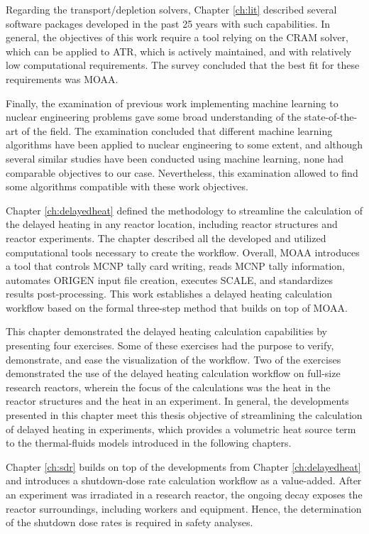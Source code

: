 Regarding the transport/depletion solvers, Chapter \ref{ch:lit} described several software packages developed in the past 25 years with such capabilities.
In general, the objectives of this work require a tool relying on the CRAM solver, which can be applied to ATR, which is actively maintained, and with relatively low computational requirements.
The survey concluded that the best fit for these requirements was MOAA.

Finally, the examination of previous work implementing machine learning to nuclear engineering problems gave some broad understanding of the state-of-the-art of the field.
The examination concluded that different machine learning algorithms have been applied to nuclear engineering to some extent, and although several similar studies have been conducted using machine learning, none had comparable objectives to our case.
Nevertheless, this examination allowed to find some algorithms compatible with these work objectives.


Chapter \ref{ch:delayedheat} defined the methodology to streamline the calculation of the delayed heating in any reactor location, including reactor structures and reactor experiments.
The chapter described all the developed and utilized computational tools necessary to create the workflow.
Overall, MOAA introduces a tool that controls MCNP tally card writing, reads MCNP tally information, automates ORIGEN input file creation, executes SCALE, and standardizes results post-processing.
This work establishes a delayed heating calculation workflow based on the formal three-step method that builds on top of MOAA.

This chapter demonstrated the delayed heating calculation capabilities by presenting four exercises.
Some of these exercises had the purpose to verify, demonstrate, and ease the visualization of the workflow.
Two of the exercises demonstrated the use of the delayed heating calculation workflow on full-size research reactors, wherein the focus of the calculations was the heat in the reactor structures and the heat in an experiment.
In general, the developments presented in this chapter meet this thesis objective of streamlining the calculation of delayed heating in experiments, which provides a volumetric heat source term to the thermal-fluids models introduced in the following chapters.


Chapter \ref{ch:sdr} builds on top of the developments from Chapter \ref{ch:delayedheat} and introduces a shutdown-dose rate calculation workflow as a value-added.
After an experiment was irradiated in a research reactor, the ongoing decay exposes the reactor surroundings, including workers and equipment.
Hence, the determination of the shutdown dose rates is required in safety analyses.

